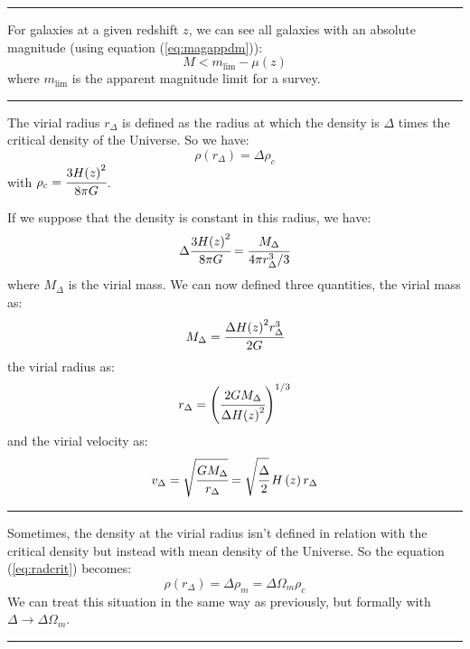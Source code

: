 \noindent\rule{\linewidth}{1pt}
%
For galaxies at a given redshift $z$, we can see all galaxies with an absolute
magnitude (using equation (\ref{eq:magappdm})):
%
\begin{equation}
    M<m_{\lim}-\mu\left(z\right)%
\end{equation}
%
where $m_{\mathrm{\lim}}$ is the apparent magnitude limit for a survey.

\noindent\rule{\linewidth}{1pt}
%
The virial radius $r_\Delta$ is defined as the radius at which the density is
$\Delta$ times the critical density of the Universe. So we have:
%
\begin{equation}\label{eq:radcrit}
	\rho\left({r_\Delta}\right)=\Delta\rho_c
\end{equation}
%
with $\rho_c=\cfrac{3H{\left({z}\right)}^2}{8\pi{G}}$.

If we suppose that the density is constant in this radius, we have:
%
\begin{equation}
	\Delta\cfrac{3H{\left({z}\right)}^2}{8\pi{G}} =
    \cfrac{M_\Delta}{4\pi{r_\Delta^3}/3}
\end{equation}
%
where $M_\Delta$ is the virial mass. We can now defined three quantities, the
virial mass as:
%
\begin{equation}
	M_\Delta=\cfrac{\Delta{H{\left({z}\right)}^2{r_\Delta^3}}}{2G}
\end{equation}
%
the virial radius as:
%
\begin{equation}
    r_\Delta={\left(\cfrac{2 G M_\Delta}
    {\Delta{H{\left({z}\right)}^2}}\right)}^{1/3}
\end{equation}
%
and the virial velocity as:
%
\begin{equation}
	v_\Delta=
    \sqrt{\cfrac{G M_\Delta}{r_\Delta}}=
    \sqrt{\cfrac{\Delta}{2}} \,H\left({z}\right){r_\Delta}
\end{equation}

\noindent\rule{\linewidth}{1pt}
%
Sometimes, the density at the virial radius isn't defined in relation with the
critical density but instead with mean density of the Universe. So the equation
(\ref{eq:radcrit}) becomes:
%
\begin{equation}
	\rho\left({r_\Delta}\right)=\Delta\rho_m=\Delta{\Omega_m}\rho_c
\end{equation}
%
We can treat this situation in the same way as previously, but formally with
$\Delta\rightarrow\Delta\Omega_m$.

\noindent\rule{\linewidth}{1pt}


